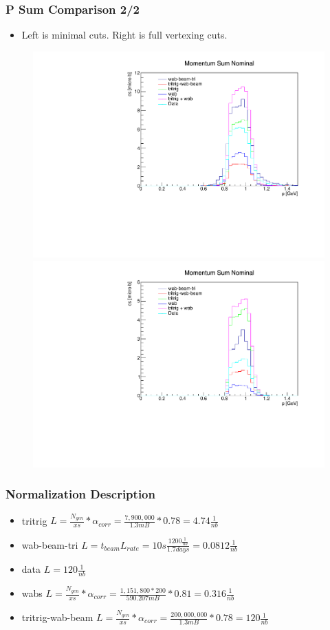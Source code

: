 \documentclass{beamer}
\begin{document}
\begin{frame}
\frametitle{P Sum Comparison 2/2}
\begin{itemize}
\item Left is minimal cuts. Right is full vertexing cuts.
\end{itemize}
\begin{figure}
\includegraphics[width=0.55\linewidth]{figs/psum_minimal.pdf}
\includegraphics[width=0.55\linewidth]{figs/psum_vertexing.pdf}
\end{figure}

\end{frame}


\begin{frame}
\frametitle{Normalization Description}
\begin{itemize}
\item tritrig
$L=\frac{N_{gen}}{xs}*\alpha_{corr}=\frac{7,900,000}{1.3 mB}*0.78=4.74 \frac{1}{nb}$
\item wab-beam-tri
$L = t_{beam} L_{rate}=10 s \frac{1200 \frac{1}{nb}}{1.7 days}=0.0812 \frac{1}{nb}$
\item data
$L = 120 \frac{1}{nb}$
\item wabs
$L=\frac{N_{gen}}{xs}*\alpha_{corr}=\frac{1,151,800*200}{590.207 mB}*0.81=0.316 \frac{1}{nb}$
\item tritrig-wab-beam
$L=\frac{N_{gen}}{xs}*\alpha_{corr}=\frac{200,000,000}{1.3 mB}*0.78=120 \frac{1}{nb}$
\end{itemize}

\end{frame}
\end{document}
